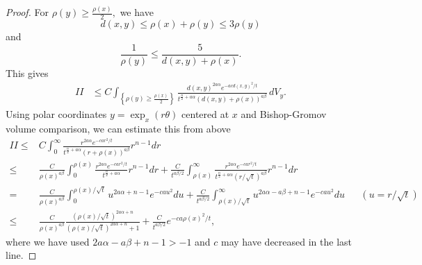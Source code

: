 \documentclass[12pt]{amsart}
\renewcommand{\1}{{\mathbf 1}}
\theoremstyle{others}
\numberwithin{equation}{section}
\begin{document}
\begin{proof}
    For $\rho(y) \geq \frac{\rho(x)}{2},$ we have
    $$d(x,y) \leq \rho(x) + \rho(y) \leq 3 \rho(y)$$
    and
    $$ \frac{1}{\rho(y)}\leq \frac{5}{d(x,y) + \rho(x)}.$$
    This gives
    \begin{equation*}
    \begin{split}
    II & \leq C\int_{\left\{ \rho(y) \geq \frac{\rho(x)}{2} \right\} } \frac{d(x,y)^{2a\alpha} e^{-a c d(x,y)^2/t} }{t^{\frac{n}{2} + a\alpha } \left( d(x,y) + \rho(x) \right)^{a\beta} } \, dV_y.
    \end{split}
    \end{equation*}
    Using polar coordinates $y = \exp_x(r \theta) $ centered at $x$ and Bishop-Gromov volume comparison, we can estimate this from above
    \begin{align*}
        II \le{}& C \int_0^\infty \frac{r^{2 a \alpha} e^{-ca r^2/t}}{t^{\frac n2 + a \alpha} ( r + \rho(x))^{a \beta}} r^{n-1} dr 
        \\
        \le{}& \frac C{\rho(x)^{a\beta}} \int_0^{\rho(x)} \frac{r^{2 a \alpha} e^{-ca r^2/t}}{t^{\frac n2 + a \alpha} } r^{n-1} dr 
        + \frac C{t^{a \beta/2}} \int_{\rho(x)}^\infty \frac{r^{2 a \alpha} e^{-ca r^2/t}}{t^{\frac n2 + a \alpha} ( r /\sqrt t)^{a \beta}} r^{n-1} dr \\
        ={}& \frac C{\rho(x)^{a\beta}} \int_0^{\rho(x)/\sqrt{t}} u^{2 a \alpha + n-1} e^{-ca u^2} du 
        + \frac C{t^{a \beta/2}} \int_{\rho(x)/\sqrt t}^\infty u^{2 a \alpha - a \beta + n-1} e^{- ca u^2 } du
        && ( u = r/ \sqrt t) \\
        \le{}& \frac C{\rho(x)^{a \beta}} \frac{(\rho(x)/\sqrt t)^{2 a \alpha + n}}{ (\rho(x)/\sqrt t)^{2 a \alpha + n} + 1  }
        + \frac C{t^{a \beta/2}} e^{- c a \rho(x)^2 / t} ,
    \end{align*}
    where we have used $2 a \alpha - a \beta + n - 1 > -1$ and $c$ may have decreased in the last line.


\end{proof}
\end{document}
